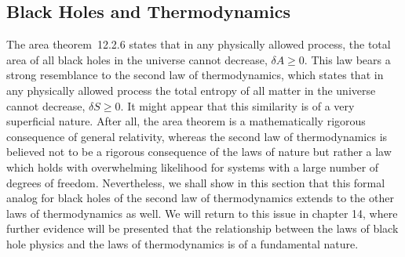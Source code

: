 
\subsection{Black Holes and Thermodynamics}\label{sec:12.5}
\setcounter{theorem}{0}

The area theorem~12.2.6 states that in any physically allowed process, the total area
of all black holes in the universe cannot decrease, \(\delta A\geq0\). This law bears a
strong resemblance to the second law of thermodynamics, which states that in any
physically allowed process the total entropy of all matter in the universe cannot
decrease, \(\delta S\geq0\). It might appear that this similarity is of a very
superficial nature. After all, the area theorem is a mathematically rigorous
consequence of general relativity, whereas the second law of thermodynamics is
believed not to be a rigorous consequence of the laws of nature but rather a law
which holds with overwhelming likelihood for systems with a large number of degrees
of freedom. Nevertheless, we shall show in this section that this formal analog for
black holes of the second law of thermodynamics extends to the other laws of
thermodynamics as well. We will return to this issue in chapter 14, where further
evidence will be presented that the relationship between the laws of black hole physics
and the laws of thermodynamics is of a fundamental nature.

